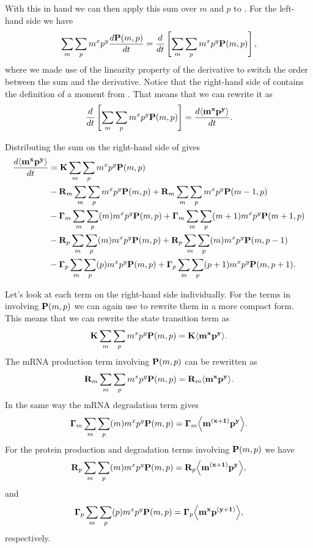 With this in hand we can then apply this sum over $m$ and $p$ to
. For the left-hand side we have
\begin{equation}
  \sum_m \sum_p m^x p^y {d{\mathbf{P}(m, p)} \over dt} = {d{} \over dt}\left[ \sum_m \sum_p m^x p^y \mathbf{P}(m, p) \right],
  \label{seq_sum_mom}
\end{equation}
where we made use of the linearity property of the derivative to switch the
order between the sum and the derivative. Notice that the right-hand side of
 contains the definition of a moment from .
That means that we can rewrite it as
\begin{equation}
  {d{} \over dt}\left[ \sum_m \sum_p m^x p^y \mathbf{P}(m, p) \right] = {d{\mathbf{\left\langle m^x p^y \right\rangle}} \over dt}.
\end{equation}

Distributing the sum on the right-hand side of  gives
\begin{equation}
  \begin{aligned}
    {d{\mathbf{\left\langle m^x p^y \right\rangle}} \over dt} &=
    \mathbf{K} \sum_m \sum_p m^x p^y \mathbf{P}(m, p)\\
    &- \mathbf{R}_m \sum_m \sum_p m^x p^y \mathbf{P}(m, p) + \mathbf{R}_m \sum_m \sum_p m^x p^y \mathbf{P}(m-1, p)\\
    &- \mathbf{\Gamma}_m \sum_m \sum_p (m) m^x p^y \mathbf{P}(m, p) + \mathbf{\Gamma}_m \sum_m \sum_p (m + 1) m^x p^y \mathbf{P}(m + 1, p)\\
    &- \mathbf{R}_p \sum_m \sum_p (m) m^x p^y \mathbf{P}(m, p) + \mathbf{R}_p \sum_m \sum_p (m) m^x p^y \mathbf{P}(m, p - 1)\\
    &- \mathbf{\Gamma}_p \sum_m \sum_p (p) m^x p^y \mathbf{P}(m, p) + \mathbf{\Gamma}_p \sum_m \sum_p (p + 1) m^x p^y \mathbf{P}(m, p + 1).
  \end{aligned}
  \label{seq_master_sum}
\end{equation}

Let's look at each term on the right-hand side individually. For the terms in
 involving $\mathbf{P}(m, p)$ we can again use 
to rewrite them in a more compact form. This means that we can rewrite the
state transition term as
\begin{equation}
  \mathbf{K} \sum_m \sum_p m^x p^y \mathbf{P}(m, p) = \mathbf{K} \mathbf{\left\langle m^x p^y \right\rangle}.
\end{equation}
The mRNA production term involving $\mathbf{P}(m, p)$ can be rewritten as
\begin{equation}
  \mathbf{R}_m \sum_m \sum_p m^x p^y \mathbf{P}(m, p) = \mathbf{R}_m \mathbf{\left\langle m^x p^y \right\rangle}.
\end{equation}
In the same way the mRNA degradation term gives
\begin{equation}
  \mathbf{\Gamma}_m \sum_m \sum_p (m) m^x p^y \mathbf{P}(m, p) = \mathbf{\Gamma}_m \mathbf{\left\langle m^{(x + 1)} p^y \right\rangle}.
\end{equation}
For the protein production and degradation terms involving $\mathbf{P}(m, p)$ we have
\begin{equation}
  \mathbf{R}_p \sum_m \sum_p (m) m^x p^y \mathbf{P}(m, p) = \mathbf{R}_p \mathbf{\left\langle m^{(x + 1)} p^y \right\rangle},
\end{equation}
and
\begin{equation}
  \mathbf{\Gamma}_p \sum_m \sum_p (p) m^x p^y \mathbf{P}(m, p) = \mathbf{\Gamma}_p \mathbf{\left\langle m^x p^{(y + 1)} \right\rangle},
\end{equation}
respectively.

